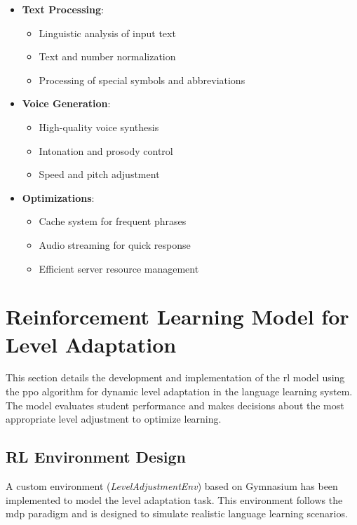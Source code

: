 \begin{itemize}
    \item \textbf{Text Processing}:
    \begin{itemize}
        \item Linguistic analysis of input text
        \item Text and number normalization
        \item Processing of special symbols and abbreviations
    \end{itemize}

    \item \textbf{Voice Generation}:
    \begin{itemize}
        \item High-quality voice synthesis
        \item Intonation and prosody control
        \item Speed and pitch adjustment
    \end{itemize}

    \item \textbf{Optimizations}:
    \begin{itemize}
        \item Cache system for frequent phrases
        \item Audio streaming for quick response
        \item Efficient server resource management
    \end{itemize}
\end{itemize}

\section{Reinforcement Learning Model for Level Adaptation}
\label{ppo-model}

This section details the development and implementation of the \gls{rl} model using the \gls{ppo} algorithm for dynamic level adaptation in the language learning system. The model evaluates student performance and makes decisions about the most appropriate level adjustment to optimize learning.

\subsection{RL Environment Design}
\label{diseno-entorno-rl}

A custom environment (\textit{LevelAdjustmentEnv}) based on Gymnasium has been implemented to model the level adaptation task. This environment follows the \gls{mdp} paradigm and is designed to simulate realistic language learning scenarios.

